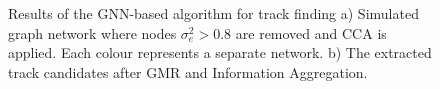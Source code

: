 \begin{center}
\begin{figure}[htbp]%
    \centering
    \hfill
    \caption{Results of the GNN-based algorithm for track finding a) Simulated graph network where nodes $\sigma_e^2 > 0.8$ are removed and CCA is applied. Each colour represents a separate network. b) The extracted track candidates after GMR and Information Aggregation.}%
    \label{fig:example-application-1}%
\end{figure}
\end{center}




